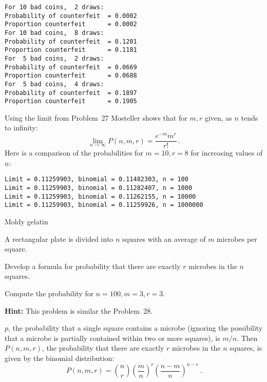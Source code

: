\sml{}
\begin{verbatim}
For 10 bad coins,  2 draws:
Probability of counterfeit  = 0.0002
Proportion counterfeit      = 0.0002
For 10 bad coins,  8 draws:
Probability of counterfeit  = 0.1201
Proportion counterfeit      = 0.1181
For  5 bad coins,  2 draws:
Probability of counterfeit  = 0.0669
Proportion counterfeit      = 0.0688
For  5 bad coins,  4 draws:
Probability of counterfeit  = 0.1897
Proportion counterfeit      = 0.1905
\end{verbatim}

Using the limit from Problem~27 Mosteller shows that for $m,r$ given, as $n$ tends to infinity:
\begin{equation}\label{eq.bin-limit}
\lim_{n\rightarrow \infty}P(n,m,r) = \frac{e^{-m}m^r}{r!}\,.
\end{equation}
Here is a comparison of the probabilities for $m=10, r=8$ for increasing values of $n$:

\begin{verbatim}
Limit = 0.11259903, binomial = 0.11482303, n = 100
Limit = 0.11259903, binomial = 0.11282407, n = 1000
Limit = 0.11259903, binomial = 0.11262155, n = 10000
Limit = 0.11259903, binomial = 0.11259926, n = 1000000
\end{verbatim}


\begin{prob}{Moldy gelatin}

A rectangular plate is divided into $n$ squares with an average of $m$ microbes per square.

 Develop a formula for probability that there are exactly $r$ microbes in the $n$ squares.

 Compute the probability for $n=100, m=3, r=3$.

\textbf{Hint:} This problem is similar the Problem~28.

\end{prob}

\solution{}

$p$, the probability that a single square contains a microbe (ignoring the possibility that a microbe is partially contained within two or more squares), is $m/n$. Then $P(n,m,r)$, the probability that there are exactly $r$ microbes in the $n$ squares, is given by the binomial distribution:
\[
P(n,m,r) = {n \choose r} \left(\frac{m}{n}\right)^r \left(\frac{n-m}{n}\right)^{n-r}\,.
\]


